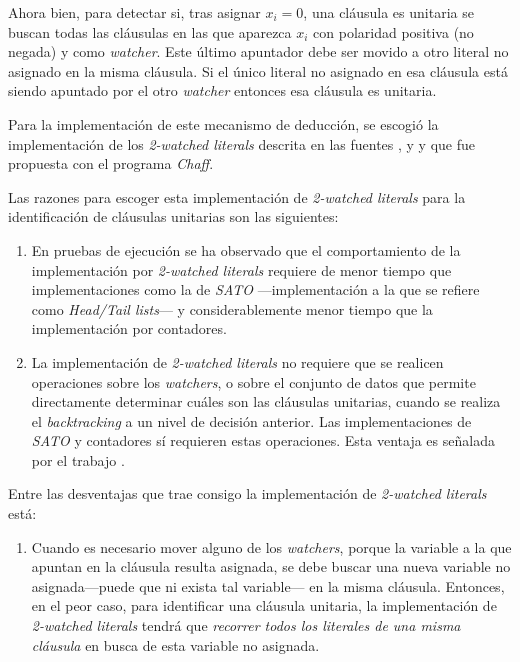 \documentclass[12pt,lettersize,oneside]{article}
\begin{document}
Ahora bien, para detectar si, tras asignar $x_i=0$, una cláusula
es unitaria se buscan todas las cláusulas en las que aparezca $x_i$ con
polaridad positiva (no negada) y como \emph{watcher}. Este último apuntador debe
ser movido a otro literal no asignado en la misma cláusula. Si el único literal
no asignado en esa cláusula está siendo apuntado por el otro \emph{watcher}
entonces esa cláusula es unitaria. 

Para la implementación de este mecanismo de deducción, se escogió la
implementación de los \emph{2-watched literals} descrita en las fuentes
\cite{Marques}, \cite{Zhang} y \cite{ZhangThesis} y que fue propuesta con el
programa \emph{Chaff}.



Las razones para escoger esta implementación de \emph{2-watched literals} para
la identificación de cláusulas unitarias son las siguientes:\vspace{-2.5mm}
\begin{enumerate}
\item En pruebas de ejecución\cite{Zhang} se ha observado que el comportamiento
  de la implementación por \emph{2-watched literals} requiere de menor tiempo
  que implementaciones como la de \emph{SATO} ---implementación a la que
  \cite{Zhang} se refiere como \emph{Head/Tail lists}--- y considerablemente
  menor tiempo que la implementación por contadores.
\item La implementación de \emph{2-watched literals} no requiere que se realicen
  operaciones sobre los \emph{watchers}, o sobre el conjunto de datos que
  permite directamente determinar cuáles son las cláusulas unitarias, cuando se
  realiza el \emph{backtracking} a un nivel de decisión anterior. Las
  implementaciones de \emph{SATO} y contadores sí requieren estas
  operaciones. Esta ventaja es señalada por el trabajo \cite{Marques}.
\end{enumerate}

Entre las desventajas que trae consigo la implementación de \emph{2-watched
  literals} está:\vspace{-2.5mm}
\begin{enumerate}
\item Cuando es necesario mover alguno de los \emph{watchers}, porque la variable
  a la que apuntan en la cláusula resulta asignada, se debe buscar una nueva
  variable no asignada---puede que ni exista tal variable--- en la misma
  cláusula. Entonces, en el peor caso, para identificar una cláusula unitaria,
  la implementación de \emph{2-watched literals} tendrá que \emph{recorrer todos
    los literales de una misma cláusula} en busca de esta variable no asignada.
\end{enumerate}
\end{document}

